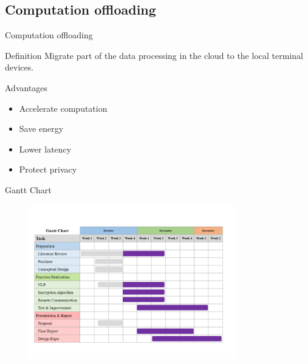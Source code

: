 \documentclass[12pt]{beamer}
\begin{document}
\subsection{Computation offloading}
\begin{frame}{Computation offloading}
    \begin{block}{Definition}
        Migrate part of the data processing in the cloud to the local terminal devices.
    \end{block}
    \begin{block}{Advantages}
        \begin{itemize}
            \item Accelerate computation
            \item Save energy
            \item Lower latency
            \item Protect privacy
        \end{itemize}
    \end{block}
\end{frame}

\begin{frame}{Gantt Chart}
    \begin{figure}[!htb]
        \centering
        \includegraphics[width=0.8\textwidth]{Gantt Chart.png}
    \end{figure}
\end{frame}
\end{document}
